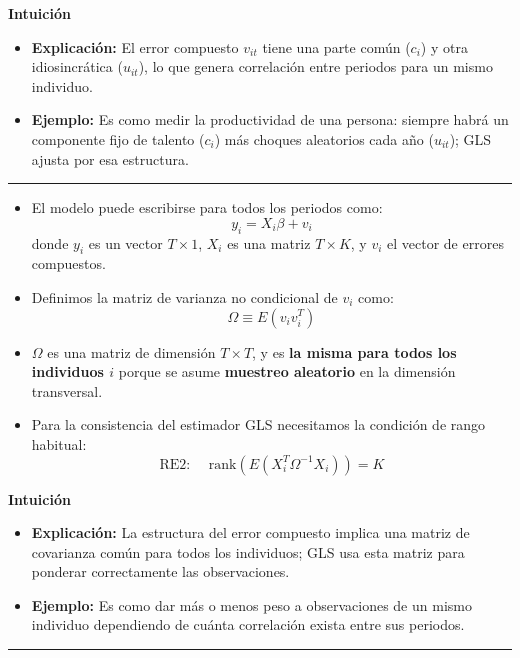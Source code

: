 \documentclass[12pt]{article}
\begin{document}
\noindent\textbf{Intuición}
\begin{itemize}
    \item \textbf{Explicación:} El error compuesto $v_{it}$ tiene una parte común ($c_i$) y otra idiosincrática ($u_{it}$), lo que genera correlación entre periodos para un mismo individuo.
    \item \textbf{Ejemplo:} Es como medir la productividad de una persona: siempre habrá un componente fijo de talento ($c_i$) más choques aleatorios cada año ($u_{it}$); GLS ajusta por esa estructura.
\end{itemize}

\hrule

\begin{itemize}
    \item El modelo puede escribirse para todos los periodos como:
    \[
    y_i = X_i \beta + v_i
    \]
    donde $y_i$ es un vector $T \times 1$, $X_i$ es una matriz $T \times K$, y $v_i$ el vector de errores compuestos.
    
    \item Definimos la matriz de varianza no condicional de $v_i$ como:
    \[
    \Omega \equiv E(v_i v_i^T)
    \]
    
    \item $\Omega$ es una matriz de dimensión $T \times T$, y es \textbf{la misma para todos los individuos $i$} porque se asume \textbf{muestreo aleatorio} en la dimensión transversal.
    
    \item Para la consistencia del estimador GLS necesitamos la condición de rango habitual:
    \[
    \text{RE2: } \quad \text{rank}\!\left( E(X_i^T \Omega^{-1} X_i) \right) = K
    \]
\end{itemize}

\noindent\textbf{Intuición}
\begin{itemize}
    \item \textbf{Explicación:} La estructura del error compuesto implica una matriz de covarianza común para todos los individuos; GLS usa esta matriz para ponderar correctamente las observaciones.
    \item \textbf{Ejemplo:} Es como dar más o menos peso a observaciones de un mismo individuo dependiendo de cuánta correlación exista entre sus periodos.
\end{itemize}

\hrule
\end{document}
